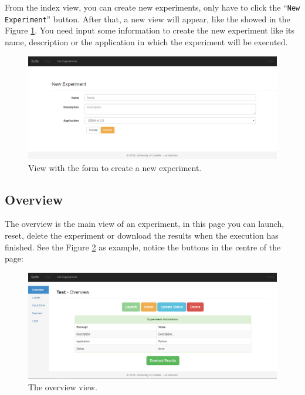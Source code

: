 \documentclass[11pt]{article}
\begin{document}
From the index view, you can create new experiments, only have to click the ``\texttt{New Experiment}'' button. After that, a new view will appear, like the showed in the Figure \ref{fig:create}. You need input some information to create the new experiment like its name, description or the application in which the experiment will be executed.
\begin{figure}[htp]
	\centering
	\includegraphics[width=\linewidth]{img/create}
	\caption{View with the form to create a new experiment.}
	\label{fig:create}
\end{figure}

\subsection{Overview}\label{sec:overview}
The overview is the main view of an experiment, in this page you can launch, reset, delete the experiment or download the results when the execution has finished. See the Figure \ref{fig:overview-done} as example, notice the buttons in the centre of the page:
\begin{figure}[htp]
	\centering
	\includegraphics[width=\linewidth]{img/overview-done}
	\caption{The overview view.}
	\label{fig:overview-done}
\end{figure}
\end{document}
